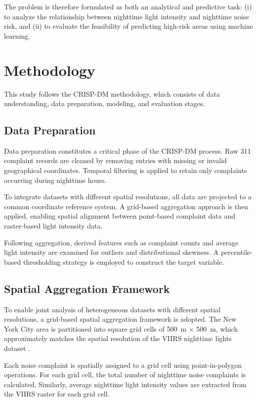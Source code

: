 \documentclass[conference]{IEEEtran}
\begin{document}
The problem is therefore formulated as both an analytical and predictive task:
(i) to analyze the relationship between nighttime light intensity and nighttime noise risk,
and (ii) to evaluate the feasibility of predicting high-risk areas using machine learning.

\section{Methodology}

This study follows the CRISP-DM methodology, which consists of data understanding,
data preparation, modeling, and evaluation stages.

\subsection{Data Preparation}

Data preparation constitutes a critical phase of the CRISP-DM process.
Raw 311 complaint records are cleaned by removing entries with missing or invalid
geographical coordinates.
Temporal filtering is applied to retain only complaints occurring during nighttime hours.

To integrate datasets with different spatial resolutions, all data are projected
to a common coordinate reference system.
A grid-based aggregation approach is then applied, enabling spatial alignment between
point-based complaint data and raster-based light intensity data.

Following aggregation, derived features such as complaint counts and average light
intensity are examined for outliers and distributional skewness.
A percentile-based thresholding strategy is employed to construct the target variable.

\subsection{Spatial Aggregation Framework}

To enable joint analysis of heterogeneous datasets with different spatial resolutions,
a grid-based spatial aggregation framework is adopted.
The New York City area is partitioned into square grid cells of
500~m $\times$ 500~m, which approximately matches the spatial resolution
of the VIIRS nighttime lights dataset \cite{elvidge2017viirs}.

Each noise complaint is spatially assigned to a grid cell using point-in-polygon
operations.
For each grid cell, the total number of nighttime noise complaints is calculated.
Similarly, average nighttime light intensity values are extracted from the VIIRS raster
for each grid cell.
\end{document}
